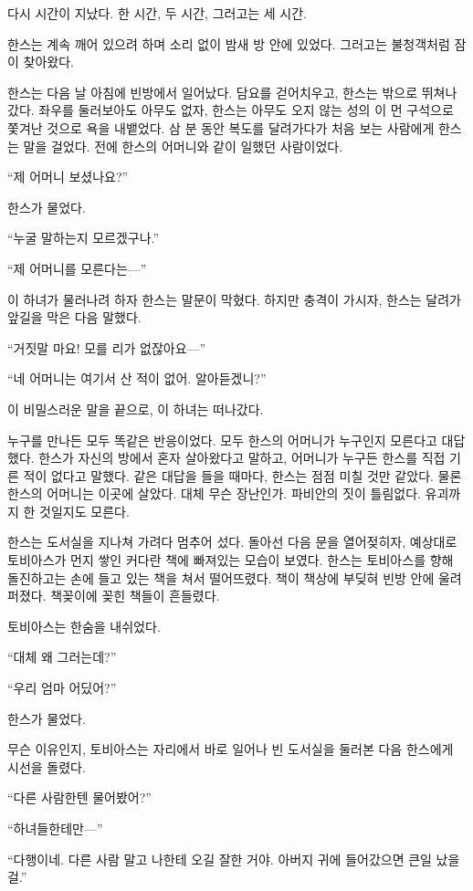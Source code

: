 다시 시간이 지났다. 한 시간, 두 시간, 그러고는 세 시간.

한스는 계속 깨어 있으려 하며 소리 없이 밤새 방 안에 있었다. 그러고는 불청객처럼 잠이 찾아왔다.

\textbreak

한스는 다음 날 아침에 빈방에서 일어났다. 담요를 걷어치우고, 한스는 밖으로 뛰쳐나갔다. 좌우를 둘러보아도 아무도 없자, 한스는 아무도 오지 않는 성의 이 먼 구석으로 쫓겨난 것으로 욕을 내뱉었다. 삼 분 동안 복도를 달려가다가 처음 보는 사람에게 한스는 말을 걸었다. 전에 한스의 어머니와 같이 일했던 사람이었다.

``제 어머니 보셨나요?''

한스가 물었다.

``누굴 말하는지 모르겠구나.''

``제 어머니를 모른다는—''

이 하녀가 물러나려 하자 한스는 말문이 막혔다. 하지만 충격이 가시자, 한스는 달려가 앞길을 막은 다음 말했다.

``거짓말 마요! 모를 리가 없잖아요—''

``네 어머니는 여기서 산 적이 없어. 알아듣겠니?''

이 비밀스러운 말을 끝으로, 이 하녀는 떠나갔다.

누구를 만나든 모두 똑같은 반응이었다. 모두 한스의 어머니가 누구인지 모른다고 대답했다. 한스가 자신의 방에서 혼자 살아왔다고 말하고, 어머니가 누구든 한스를 직접 기른 적이 없다고 말했다. 같은 대답을 들을 때마다, 한스는 점점 미칠 것만 같았다. 물론 한스의 어머니는 이곳에 살았다. 대체 무슨 장난인가. 파비안의 짓이 틀림없다. 유괴까지 한 것일지도 모른다.

한스는 도서실을 지나쳐 가려다 멈추어 섰다. 돌아선 다음 문을 열어젖히자, 예상대로 토비아스가 먼지 쌓인 커다란 책에 빠져있는 모습이 보였다. 한스는 토비아스를 향해 돌진하고는 손에 들고 있는 책을 쳐서 떨어뜨렸다. 책이 책상에 부딪혀 빈방 안에 울려 퍼졌다. 책꽂이에 꽂힌 책들이 흔들렸다.

토비아스는 한숨을 내쉬었다.

``대체 왜 그러는데?''

``우리 엄마 어딨어?''

한스가 물었다.

무슨 이유인지, 토비아스는 자리에서 바로 일어나 빈 도서실을 둘러본 다음 한스에게 시선을 돌렸다.

``다른 사람한텐 물어봤어?''

``하녀들한테만—''

``다행이네. 다른 사람 말고 나한테 오길 잘한 거야. 아버지 귀에 들어갔으면 큰일 났을걸.''


